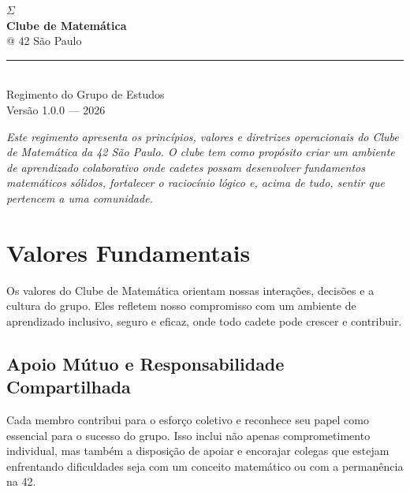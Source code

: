 \documentclass[12pt, a4paper]{article}
\begin{document}
\thispagestyle{empty}

\begin{center}
  \vspace*{3cm}
  {\fontsize{72}{72}\selectfont\color{azul42}$\Sigma$}\\[0.8cm]
  {\fontsize{32}{36}\selectfont\color{azul42}\textbf{Clube de Matemática}}\\[0.3cm]
  {\fontsize{20}{24}\selectfont\color{cinza}@ 42 São Paulo}\\[1.2cm]
  {\color{azul42}\rule{0.6\textwidth}{1.5pt}}\\[0.8cm]
  {\large\color{cinza}Regimento do Grupo de Estudos}\\[0.4cm]
  {\normalsize\color{cinza}Versão 1.0.0 --- 2026}\\[1.5cm]
  \begin{minipage}{0.75\textwidth}
    \centering\itshape\color{cinza}\small
    Este regimento apresenta os princípios, valores e diretrizes operacionais do
    Clube de Matemática da 42 São Paulo. O clube tem como propósito criar um
    ambiente de aprendizado colaborativo onde cadetes possam desenvolver
    fundamentos matemáticos sólidos, fortalecer o raciocínio lógico e, acima
    de tudo, sentir que pertencem a uma comunidade.
  \end{minipage}
\end{center}

\clearpage
\tableofcontents
\clearpage

\section{Valores Fundamentais}

Os valores do Clube de Matemática orientam nossas interações, decisões e a cultura do grupo.
Eles refletem nosso compromisso com um ambiente de aprendizado inclusivo, seguro e eficaz,
onde todo cadete pode crescer e contribuir.

\subsection{Apoio Mútuo e Responsabilidade Compartilhada}

Cada membro contribui para o esforço coletivo e reconhece seu papel como essencial para o
sucesso do grupo. Isso inclui não apenas comprometimento individual, mas também a disposição
de apoiar e encorajar colegas que estejam enfrentando dificuldades seja com um conceito
matemático ou com a permanência na 42.
\end{document}
